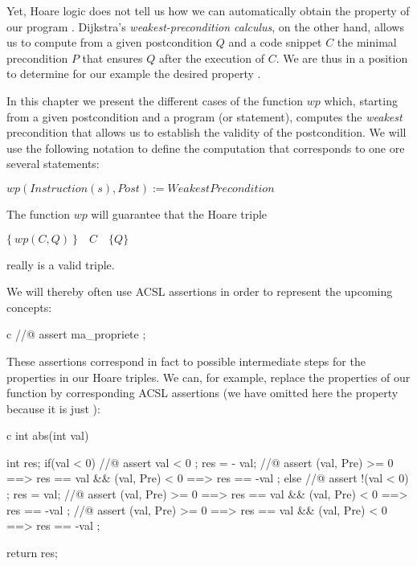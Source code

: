 Yet, Hoare logic does not tell us how we can automatically obtain the
property  of our program . Dijkstra's
\emph{weakest-precondition calculus}, on the other hand, allows us to
compute from a given postcondition $Q$ and a code snippet $C$ the
minimal precondition $P$ that ensures $Q$ after the execution of
$C$. We are thus in a position to determine for our example
 the desired property .




In this chapter we present the different cases of the function $wp$
which, starting from a given postcondition and a program (or statement),
computes the \emph{weakest} precondition that allows us to establish the
validity of the postcondition. We will use the following notation to
define the computation that corresponds to one ore several statements:



$wp(Instruction(s), Post) := WeakestPrecondition$



The function \(wp\) will guarantee that the Hoare triple




\begin{center}
$\{\ wp(C,Q)\ \}\quad C\quad \{ Q \}$


\end{center}


really is a valid triple.



We will thereby often use ACSL assertions in order to represent the
upcoming concepts:



\begin{CodeBlock}{c}
//@ assert ma_propriete ;
\end{CodeBlock}



These assertions correspond in fact to possible intermediate steps for
the properties in our Hoare triples. We can, for example, replace the
properties of our function  by corresponding ACSL assertions
(we have omitted here the property  because it is just
):



\begin{CodeBlock}{c}
int abs(int val){
  int res;
  if(val < 0){
    //@ assert val < 0 ;
    res = - val;
    //@ assert \at(val, Pre) >= 0 ==> res == val && \at(val, Pre) < 0 ==> res == -val ;
  } else {
    //@ assert !(val < 0) ;
    res = val;
    //@ assert \at(val, Pre) >= 0 ==> res == val && \at(val, Pre) < 0 ==> res == -val ;
  }
  //@ assert \at(val, Pre) >= 0 ==> res == val && \at(val, Pre) < 0 ==> res == -val ;

  return res;
}
\end{CodeBlock}

